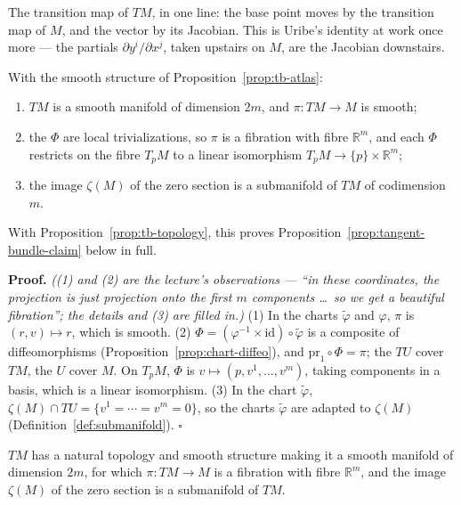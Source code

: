 \documentclass[11pt]{report}
\makeatletter
\newcounter{thmcounter}[section]
\renewenvironment{proof}[1][Proof]{\noindent\textbf{#1.} }{\hfill$\square$\par\vspace{5pt}}
\newcommand{\thmlabel}[1]{\edef\@currentlabel{\arabic{section}.\arabic{thmcounter}}\label{#1}}
\newcommand{\leeref}[1]{\par\smallskip{\raggedleft\footnotesize\textsc{Lee}:\ #1\par}}
\makeatother
\begin{document}
The transition map of $TM$, in one line: the base point moves by the transition map of $M$, and the vector by its Jacobian. This is Uribe's identity at work once more --- the partials $\partial y^i/\partial x^j$, taken upstairs on $M$, are the Jacobian downstairs.

\begin{corbox}\thmlabel{cor:tb-fibration}
With the smooth structure of Proposition~\ref{prop:tb-atlas}:
\begin{enumerate}
    \item $TM$ is a smooth manifold of dimension $2m$, and $\pi : TM \to M$ is smooth;
    \item the $\Phi$ are local trivializations, so $\pi$ is a fibration with fibre $\mathbb{R}^m$, and each $\Phi$ restricts on the fibre $T_pM$ to a linear isomorphism $T_pM \to \{p\} \times \mathbb{R}^m$;
    \item the image $\zeta(M)$ of the zero section is a submanifold of $TM$ of codimension $m$.
\end{enumerate}
With Proposition~\ref{prop:tb-topology}, this proves Proposition~\ref{prop:tangent-bundle-claim} below in full.
\end{corbox}

\begin{proof}
\textit{((1) and (2) are the lecture's observations --- ``in these coordinates, the projection is just projection onto the first $m$ components \ldots\ so we get a beautiful fibration''; the details and (3) are filled in.)} (1) In the charts $\tilde\varphi$ and $\varphi$, $\pi$ is $(r, v) \mapsto r$, which is smooth. (2) $\Phi = (\varphi^{-1} \times \mathrm{id}) \circ \tilde\varphi$ is a composite of diffeomorphisms (Proposition~\ref{prop:chart-diffeo}), and $\mathrm{pr}_1 \circ \Phi = \pi$; the $TU$ cover $TM$, the $U$ cover $M$. On $T_pM$, $\Phi$ is $v \mapsto (p, v^1, \ldots, v^m)$, taking components in a basis, which is a linear isomorphism. (3) In the chart $\tilde\varphi$, $\zeta(M) \cap TU = \{v^1 = \cdots = v^m = 0\}$, so the charts $\tilde\varphi$ are adapted to $\zeta(M)$ (Definition~\ref{def:submanifold}).
\end{proof}
\begin{propbox}\thmlabel{prop:tangent-bundle-claim}
$TM$ has a natural topology and smooth structure making it a smooth manifold of dimension $2m$, for which $\pi : TM \to M$ is a fibration with fibre $\mathbb{R}^m$, and the image $\zeta(M)$ of the zero section is a submanifold of $TM$.
\leeref{Proposition 3.18}
\end{propbox}
\end{document}
